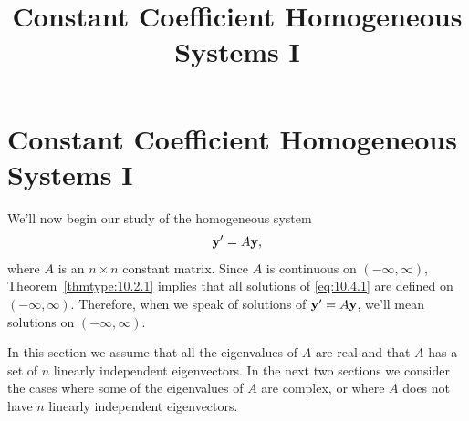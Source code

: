 \documentclass{ximera}
\title{Constant Coefficient Homogeneous Systems I}%
\begin{document}
\begin{abstract}

\end{abstract}

\maketitle

\section*{Constant Coefficient Homogeneous Systems I}

We'll now begin our study of the homogeneous system
\begin{equation}\label{eq:10.4.1}
{\bf y}'=A{\bf y},
\end{equation}
where $A$ is an $n\times n$ constant matrix. Since $A$ is continuous
on $(-\infty,\infty)$, Theorem~\ref{thmtype:10.2.1}
implies
that all solutions of \eqref{eq:10.4.1} are defined on $(-\infty,\infty)$.
Therefore, when we speak of solutions of ${\bf y}'=A{\bf y}$, we'll
mean solutions on $(-\infty,\infty)$.

In this section we assume that all the eigenvalues of $A$ are real and
that $A$ has a set of $n$ linearly independent eigenvectors. In the
next two sections we consider the cases where some of the eigenvalues
of $A$ are complex, or where $A$ does not have $n$ linearly
independent eigenvectors.
\end{document}
